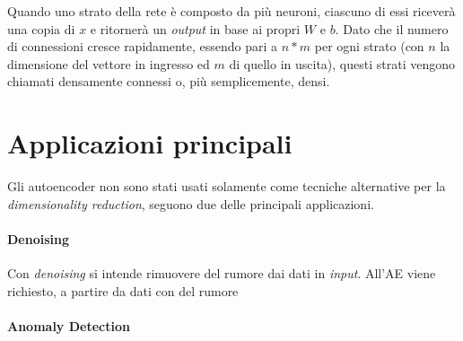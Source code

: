 Quando uno strato della rete è composto da più neuroni, ciascuno di essi riceverà una copia di $x$ e ritornerà un \textit{output} in base ai propri $W$ e $b$.
Dato che il numero di connessioni cresce rapidamente, essendo pari a $n*m$ per ogni strato (con $n$ la dimensione del vettore in ingresso ed $m$ di quello in uscita), questi strati vengono chiamati densamente connessi o, più semplicemente, densi.

\clearpage
\section{Applicazioni principali}
Gli autoencoder non sono stati usati solamente come tecniche alternative per la \textit{dimensionality reduction}, seguono due delle principali applicazioni.

\paragraph{Denoising}
Con \textit{denoising} si intende rimuovere del rumore dai dati in \textit{input}.
All'AE viene richiesto, a partire da dati con del rumore



\paragraph{Anomaly Detection}


\clearpage

\clearpage
